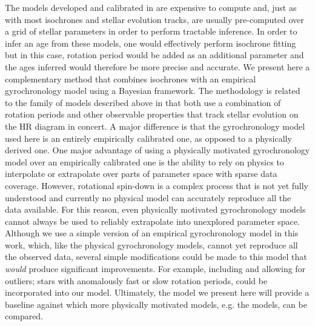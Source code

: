 The models developed and calibrated in \citet{epstein2014, vansaders2015,
vansaders2016, vansaders2018} are expensive to compute and, just as with most
isochrones and stellar evolution tracks, are usually pre-computed over a grid
of stellar parameters in order to perform tractable inference.
In order to infer an age from these models, one would effectively perform
isochrone fitting but in this case, rotation period would be added as an
additional parameter and the ages inferred would therefore be more precise and
accurate.
We present here a complementary method that combines isochrones with an
empirical gyrochronology model using a Bayesian framework.
The methodology is related to the family of models described above in that
both use a combination of rotation periods and other observable properties
that track stellar evolution on the HR diagram in concert.
A major difference is that the gyrochronology model used here is an entirely
empirically calibrated one, as opposed to a physically derived one.
One major advantage of using a physically motivated gyrochronology model over
an empirically calibrated one is the ability to rely on physics to interpolate
or extrapolate over parts of parameter space with sparse data coverage.
However, rotational spin-down is a complex process that is not yet fully
understood and currently no physical model can accurately reproduce all the
data available.
For this reason, even physically motivated gyrochronology models cannot always
be used to reliably extrapolate into unexplored parameter space.
Although we use a simple version of an empirical gyrochronology model in this
work, which, like the physical gyrochronology models, cannot yet reproduce all
the observed data, several simple modifications could be made to this model
that {\it would} produce significant improvements.
For example, including and allowing for outliers; stars with anomalously fast
or slow rotation periods, could be incorporated into our model.
Ultimately, the model we present here will provide a baseline against which
more physically motivated models, e.g. the \citet{vansaders2016} models, can
be compared.




